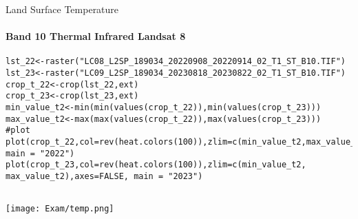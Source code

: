 \documentclass{beamer}
\begin{document}
\begin{frame}[fragile]{Land Surface Temperature}
    \framesubtitle{Band 10 Thermal Infrared Landsat 8}
  \begin{lstlisting}[style=mystyle]
lst_22<-raster("LC08_L2SP_189034_20220908_20220914_02_T1_ST_B10.TIF")
lst_23<-raster("LC09_L2SP_189034_20230818_20230822_02_T1_ST_B10.TIF")
crop_t_22<-crop(lst_22,ext)
crop_t_23<-crop(lst_23,ext)
min_value_t2<-min(min(values(crop_t_22)),min(values(crop_t_23)))
max_value_t2<-max(max(values(crop_t_22)),max(values(crop_t_23)))
#plot 
plot(crop_t_22,col=rev(heat.colors(100)),zlim=c(min_value_t2,max_value_t2),axes=FALSE, main = "2022")
plot(crop_t_23,col=rev(heat.colors(100)),zlim=c(min_value_t2, max_value_t2),axes=FALSE, main = "2023")
            
            \end{lstlisting}
            \centering
\texttt{[image: Exam/temp.png]}   
                  
\end{frame}








                  
\end{document}
